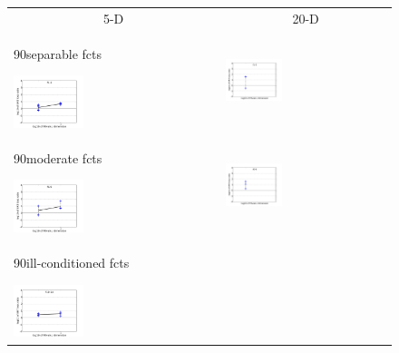 \documentclass{article}
\newcommand{\rot}[2][2.5]{
  \hspace*{-3.5\baselineskip}%
  \begin{rotate}{90}\hspace{#1em}#2
  \end{rotate}}
\begin{document}
\begin{figure}[htbp!]
\centering
\begin{tabular}{@{}ll@{}}
\multicolumn{1}{c}{5-D} & \multicolumn{1}{c}{20-D}\\
\rot{separable fcts}
\includegraphics[width=0.35\textwidth,trim=9mm 5mm 18mm 12mm, clip]{pplogloss_05D_separ} &
\includegraphics[width=0.35\textwidth,trim=9mm 5mm 18mm 12mm, clip]{pplogloss_20D_separ}\\[-2ex]
\rot[2]{moderate fcts}
\includegraphics[width=0.35\textwidth,trim=9mm 5mm 18mm 12mm, clip]{pplogloss_05D_lcond} &
\includegraphics[width=0.35\textwidth,trim=9mm 5mm 18mm 12mm, clip]{pplogloss_20D_lcond}\\[-2ex]
\rot[1.3]{ill-conditioned fcts}
\includegraphics[width=0.35\textwidth,trim=9mm 5mm 18mm 12mm, clip]{pplogloss_05D_hcond} &

\end{tabular}
\end{figure}
\end{document}

